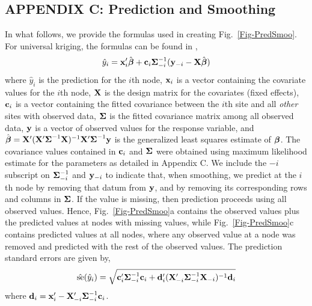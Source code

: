 \documentclass[11pt, titlepage]{article}\usepackage[]{graphicx}\usepackage[]{color}
\begin{document}
\begin{spacing}{1.9}
\begin{flushleft}

\clearpage
\setcounter{equation}{0}
\renewcommand{\theequation}{C.\arabic{equation}}
\setcounter{figure}{0}
\renewcommand{\thefigure}{C.\arabic{figure}}
\section{APPENDIX C: Prediction and Smoothing}

In what follows, we provide the formulas used in creating Fig.~\ref{Fig-PredSmoo}.  For universal kriging, the formulas can be found in \citet[][p. 148]{Cres:Wikl:stat:2011},
\[
				\hat{y}_i = \mathbf{x}_i^{\prime}\hat{\mbox{\boldmath $\beta$}} + \mathbf{c}_i\mbox{\boldmath $\Sigma$}^{-1}_{-i}(\mathbf{y}_{-i} - \mathbf{X}\hat{\mbox{\boldmath $\beta$}})
\]
where $\hat{y}_i$ is the prediction for the $i$th node, $\mathbf{x}_i$ is a vector containing the covariate values for the $i$th node, $\mathbf{X}$ is the design matrix for the covariates (fixed effects), $\mathbf{c}_i$ is a vector containing the fitted covariance between the $i$th site and all \emph{other} sites with observed data, $\mbox{\boldmath $\Sigma$}$ is the fitted covariance matrix among all observed data, $\mathbf{y}$ is a vector of observed values for the response variable, and $\hat{\mbox{\boldmath $\beta$}} = \mathbf{X}^{\prime}(\mathbf{X}^{\prime}\mbox{\boldmath $\Sigma$}^{-1}\mathbf{X})^{-1}\mathbf{X}^{\prime}\mbox{\boldmath $\Sigma$}^{-1}\mathbf{y}$ is the generalized least squares estimate of $\mbox{\boldmath $\beta$}$.  The covariance values contained in $\mathbf{c}_i$ and $\mbox{\boldmath $\Sigma$}$ were obtained using maximum likelihood estimate for the parameters as detailed in Appendix C.  We include the $-i$ subscript on $\mbox{\boldmath $\Sigma$}^{-1}_{-i}$ and $\mathbf{y}_{-i}$ to indicate that, when smoothing, we predict at the $i$th node by removing that datum from $\mathbf{y}$, and by removing its corresponding rows and columns in $\mbox{\boldmath $\Sigma$}$.  If the value is missing, then prediction proceeds using all observed values.  Hence, Fig.~\ref{Fig-PredSmoo}a contains the observed values plus the predicted values at nodes with missing values, while Fig.~\ref{Fig-PredSmoo}c contains predicted values at all nodes, where any observed value at a node was removed and predicted with the rest of the observed values.  The prediction standard errors are given by,
\[
	\hat{\textrm{se}}(\hat{y}_i) = \sqrt{\mathbf{c}_i^{\prime}\mbox{\boldmath $\Sigma$}^{-1}_{-i}\mathbf{c}_i + 
	  \mathbf{d}_i^{\prime}(\mathbf{X}_{-i}^{\prime}\mbox{\boldmath $\Sigma$}^{-1}_{-i}\mathbf{X}_{-i})^{-1} \mathbf{d}_i}
\]
where $\mathbf{d}_i = \mathbf{x}_i^{\prime} - \mathbf{X}_{-i}^{\prime}\mbox{\boldmath $\Sigma$}^{-1}_{-i}\mathbf{c}_i$.


\end{flushleft}
\end{spacing}
\end{document}
